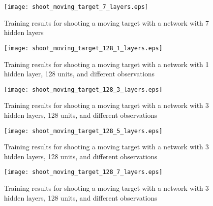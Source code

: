 \begin{figure}
    \begin{center}
        \texttt{[image: shoot\_moving\_target\_7\_layers.eps]}
        \caption{Training results for shooting a moving target with a network with 7 hidden layers}
        \label{train_results_shoot_7_layers}
    \end{center}
\end{figure}



\begin{figure}
    \begin{center}
        \texttt{[image: shoot\_moving\_target\_128\_1\_layers.eps]}
        \caption{Training results for shooting a moving target with a network with 1 hidden layer, 128 units, and different observations}
        \label{train_results_shoot_obs_comparasion_1_layers}
    \end{center}
\end{figure}

\begin{figure}
    \begin{center}
        \texttt{[image: shoot\_moving\_target\_128\_3\_layers.eps]}
        \caption{Training results for shooting a moving target with a network with 3 hidden layers, 128 units, and different observations}
        \label{train_results_shoot_obs_comparasion_3_layers}
    \end{center}
\end{figure}

\begin{figure}
    \begin{center}
        \texttt{[image: shoot\_moving\_target\_128\_5\_layers.eps]}
        \caption{Training results for shooting a moving target with a network with 3 hidden layers, 128 units, and different observations}
        \label{train_results_shoot_obs_comparasion_5_layers}
    \end{center}
\end{figure}

\begin{figure}
    \begin{center}
        \texttt{[image: shoot\_moving\_target\_128\_7\_layers.eps]}
        \caption{Training results for shooting a moving target with a network with 3 hidden layers, 128 units, and different observations}
        \label{train_results_shoot_obs_comparasion_7_layers}
    \end{center}
\end{figure}


